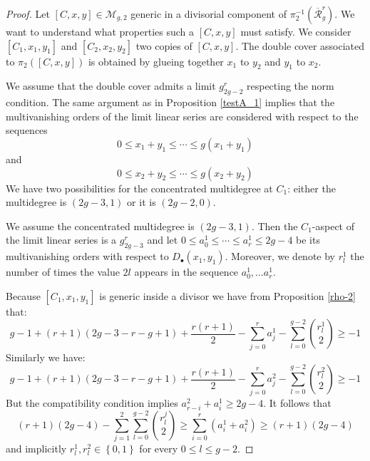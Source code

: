 \documentclass[10pt,a4paper]{amsart}
\def\cM{\mathcal{M}}
\def\rr{\overline{\mathcal{R}}}
\begin{document}
\begin{proof}
	Let $[C,x,y] \in \cM_{g,2}$ generic in a divisorial component of $\pi_2^{-1}(\rr^r_g)$. We want to understand what properties such a $[C,x,y]$ must satisfy. We consider $[C_1, x_1, y_1]$ and $[C_2, x_2, y_2]$ two copies of $[C,x,y]$. The double cover associated to $\pi_2([C,x,y])$ is obtained by glueing together $x_1$ to $y_2$ and $y_1$ to $x_2$.
	
	We assume that the double cover admits a limit $g^r_{2g-2}$ respecting the norm condition. The same argument as in Proposition \ref{testA_1} implies that the multivanishing orders of the limit linear series are considered with respect to the sequences 
	\[ 0 \leq x_1+y_1\leq \cdots \leq g(x_1+y_1)\]
	and 
		\[ 0 \leq x_2+y_2\leq \cdots \leq g(x_2+y_2)\]
	We have two possibilities for the concentrated multidegree at $C_1$: either the multidegree is $(2g-3,1)$ or it is $(2g-2,0)$. 
	
	We assume the concentrated multidegree is $(2g-3,1)$. Then the $C_1$-aspect of the limit linear series is a $g^r_{2g-3}$ and let $0\leq a^1_0 \leq \cdots \leq a^1_r \leq 2g-4$ be its multivanishing orders with respect to $D_\bullet(x_1,y_1)$. Moreover, we denote by $r^1_l$ the number of times the value $2l$ appears in the sequence $a^1_0, \ldots a^1_r$. 
	
	Because $[C_1,x_1,y_1]$ is generic inside a divisor we have from Proposition \ref{rho-2} that: 
	\[ g-1 +(r+1)(2g-3-r-g+1) + \frac{r(r+1)}{2} -\sum_{j=0}^{r}a^1_j - \sum_{l=0}^{g-2} \binom{r^1_l}{2} \geq -1 \]
	Similarly we have: 
	\[ g-1 +(r+1)(2g-3-r-g+1) + \frac{r(r+1)}{2} -\sum_{j=0}^{r}a^2_j - \sum_{l=0}^{g-2} \binom{r^2_l}{2} \geq -1 \]
	But the compatibility condition implies $a^2_{r-i} + a^1_i \geq 2g-4$. It follows that 
	\[ (r+1)(2g-4) - \sum_{j=1}^{2}\sum_{l=0}^{g-2}\binom{r^j_l}{2} \geq \sum_{i=0}^{r}(a^1_i+a^2_i) \geq (r+1)(2g-4)\]
	and implicitly $r^1_l, r^2_l \in \left\{0,1\right\}$ for every $0\leq l\leq g-2$.
	

\end{proof}
\end{document}
